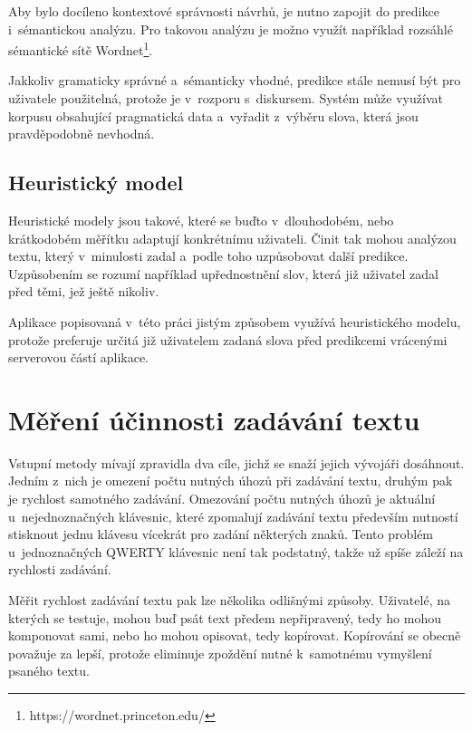 \documentclass[a4paper,11pt,openany]{book} %
\begin{document}
Aby bylo docíleno kontextové správnosti návrhů, je nutno zapojit do predikce i~sémantickou analýzu. Pro takovou analýzu je možno využít například rozsáhlé sémantické sítě Wordnet\footnote{https://wordnet.princeton.edu/}. \parencite[5235]{ghayoomi2009overview}

Jakkoliv gramaticky správné a~sémanticky vhodné, predikce stále nemusí být pro uživatele použitelná, protože je v~rozporu s~diskursem. Systém může využívat korpusu obsahující pragmatická data a~vyřadit z~výběru slova, která jsou pravděpodobně nevhodná. \parencite[5235]{ghayoomi2009overview}

\section{Heuristický model}

Heuristické modely jsou takové, které se buďto v~dlouhodobém, nebo krátkodobém měřítku adaptují konkrétnímu uživateli. Činit tak mohou analýzou textu, který v~minulosti zadal a~podle toho uzpůsobovat další predikce. Uzpůsobením se rozumí například upřednostnění slov, která již uživatel zadal před těmi, jež ještě nikoliv. \parencite[5235]{ghayoomi2009overview}

Aplikace popisovaná v~této práci jistým způsobem využívá heuristického modelu, protože preferuje určitá již uživatelem zadaná slova před predikcemi vrácenými serverovou částí aplikace.

\chapter{Měření účinnosti zadávání textu}

Vstupní metody mívají zpravidla dva cíle, jichž se snaží jejich vývojáři dosáhnout. Jedním z~nich je omezení počtu nutných úhozů při zadávání textu, druhým pak je rychlost samotného zadávání. Omezování počtu nutných úhozů je aktuální u~nejednoznačných klávesnic, které zpomalují zadávání textu především nutností stisknout jednu klávesu vícekrát pro zadání některých znaků. Tento problém u~jednoznačných QWERTY klávesnic není tak podstatný, takže už spíše záleží na rychlosti zadávání.

Měřit rychlost zadávání textu pak lze několika odlišnými způsoby. Uživatelé, na kterých se testuje, mohou buď psát text předem nepřipravený, tedy ho mohou komponovat sami, nebo ho mohou opisovat, tedy kopírovat. Kopírování se obecně považuje za lepší, protože eliminuje zpoždění nutné k~samotnému vymyšlení psaného textu. \parencite[2]{tarvainen2010beginner} %
\end{document}
